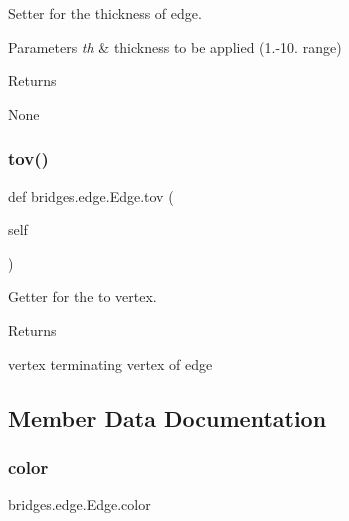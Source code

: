 Setter for the thickness of edge. 


\begin{DoxyParams}{Parameters}
{\em th} & thickness to be applied (1.-\/10. range) \\
\hline
\end{DoxyParams}
\begin{DoxyReturn}{Returns}


None 
\end{DoxyReturn}
\mbox{\label{classbridges_1_1edge_1_1_edge_a70e81381eaa6abafd0c40962326351a9}} 
\subsubsection{\texorpdfstring{tov()}{tov()}}
{\footnotesize\ttfamily def bridges.\+edge.\+Edge.\+tov (\begin{DoxyParamCaption}\item[{}]{self }\end{DoxyParamCaption})}



Getter for the to vertex. 

\begin{DoxyReturn}{Returns}


vertex terminating vertex of edge 
\end{DoxyReturn}


\subsection{Member Data Documentation}
\mbox{\label{classbridges_1_1edge_1_1_edge_ac54b17a05cab4803f7169dc6114cd9d9}} 
\subsubsection{\texorpdfstring{color}{color}}
{\footnotesize\ttfamily bridges.\+edge.\+Edge.\+color}

\mbox{\label{classbridges_1_1edge_1_1_edge_a20512d31b922b73872c168d7863bf7bf}} 
